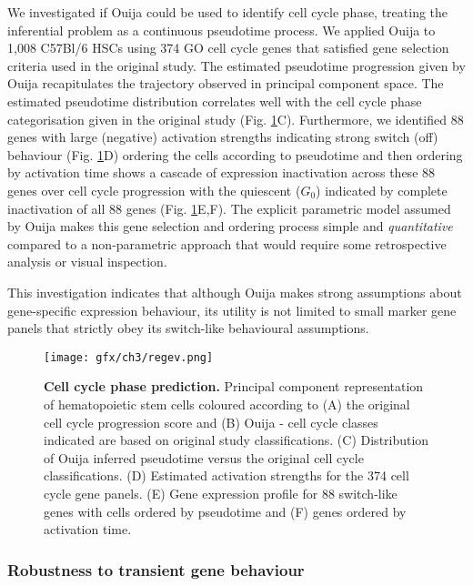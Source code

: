 We investigated if Ouija could be used to identify cell cycle phase, treating the inferential problem as a continuous pseudotime process. We applied Ouija to 1,008 C57Bl/6 HSCs using 374 GO cell cycle genes that satisfied gene selection criteria used in the original study. The estimated pseudotime progression given by Ouija recapitulates the  trajectory observed in principal component space. The estimated pseudotime distribution correlates well with the cell cycle phase categorisation  given in the original study (Fig. \ref{fig:regev}C). Furthermore, we identified 88 genes with large (negative) activation strengths indicating strong switch (off) behaviour (Fig. \ref{fig:regev}D) ordering the cells according to pseudotime and then ordering by activation time shows a cascade of expression inactivation across these 88 genes over cell cycle progression with the quiescent ($G_0$) indicated by complete inactivation of all 88 genes (Fig. \ref{fig:regev}E,F). The explicit parametric model assumed by Ouija makes this gene selection and ordering process simple and \emph{quantitative} compared to a non-parametric approach that would require some retrospective analysis or visual inspection.

This investigation indicates that although Ouija makes strong assumptions about gene-specific expression behaviour, its utility is not limited to small marker gene panels that strictly obey its switch-like behavioural assumptions.

\begin{figure}[!t]
	\texttt{[image: gfx/ch3/regev.png]}
	\caption{{\bf Cell cycle phase prediction.} Principal component representation of hematopoietic stem cells coloured according to (A) the original cell cycle progression score \cite{kowalczyk2015single} and (B) Ouija - cell cycle classes indicated are based on original study classifications. (C) Distribution of Ouija inferred pseudotime versus the original cell cycle classifications. (D) Estimated activation strengths for the 374 cell cycle gene panels. (E) Gene expression profile for 88 switch-like genes with cells ordered by pseudotime and (F) genes ordered by activation time.}
	\label{fig:regev}
\end{figure}


\subsubsection{Robustness to transient gene behaviour}

